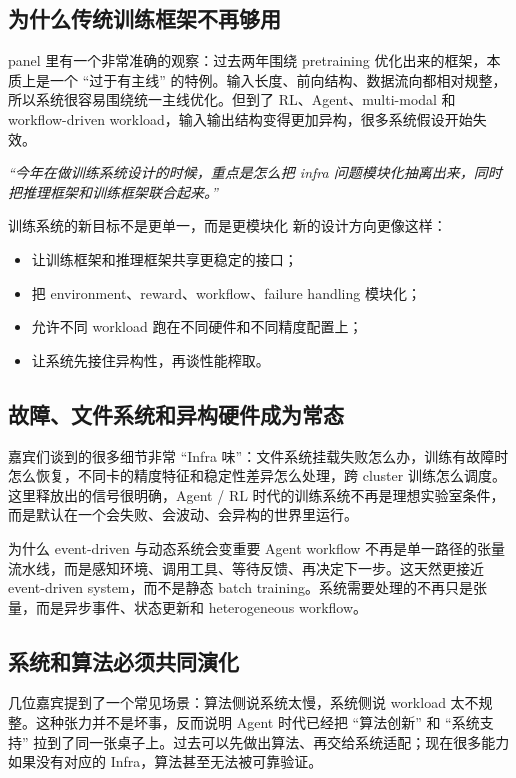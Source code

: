 \documentclass[a4paper]{article}
\begin{document}
\subsection{为什么传统训练框架不再够用}
panel 里有一个非常准确的观察：过去两年围绕 pretraining 优化出来的框架，本质上是一个 ``过于有主线'' 的特例。输入长度、前向结构、数据流向都相对规整，所以系统很容易围绕统一主线优化。但到了 RL、Agent、multi-modal 和 workflow-driven workload，输入输出结构变得更加异构，很多系统假设开始失效。

\textit{``今年在做训练系统设计的时候，重点是怎么把 infra 问题模块化抽离出来，同时把推理框架和训练框架联合起来。''}

\begin{importantbox}{训练系统的新目标不是更单一，而是更模块化}
新的设计方向更像这样：
\begin{itemize}
  \item 让训练框架和推理框架共享更稳定的接口；
  \item 把 environment、reward、workflow、failure handling 模块化；
  \item 允许不同 workload 跑在不同硬件和不同精度配置上；
  \item 让系统先接住异构性，再谈性能榨取。
\end{itemize}
\end{importantbox}

\subsection{故障、文件系统和异构硬件成为常态}
嘉宾们谈到的很多细节非常 ``Infra 味''：文件系统挂载失败怎么办，训练有故障时怎么恢复，不同卡的精度特征和稳定性差异怎么处理，跨 cluster 训练怎么调度。这里释放出的信号很明确，Agent / RL 时代的训练系统不再是理想实验室条件，而是默认在一个会失败、会波动、会异构的世界里运行。

\begin{knowledgebox}{为什么 event-driven 与动态系统会变重要}
Agent workflow 不再是单一路径的张量流水线，而是感知环境、调用工具、等待反馈、再决定下一步。这天然更接近 event-driven system，而不是静态 batch training。系统需要处理的不再只是张量，而是异步事件、状态更新和 heterogeneous workflow。
\end{knowledgebox}

\subsection{系统和算法必须共同演化}
几位嘉宾提到了一个常见场景：算法侧说系统太慢，系统侧说 workload 太不规整。这种张力并不是坏事，反而说明 Agent 时代已经把 ``算法创新'' 和 ``系统支持'' 拉到了同一张桌子上。过去可以先做出算法、再交给系统适配；现在很多能力如果没有对应的 Infra，算法甚至无法被可靠验证。
\end{document}
